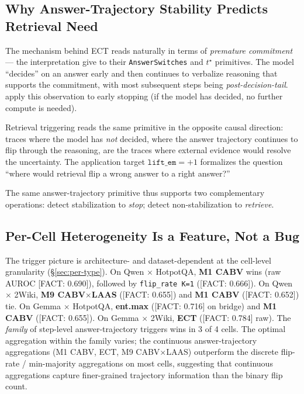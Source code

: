 \documentclass[11pt]{article}
\newcommand{\FACT}[1]{{\color{blue}\textsf{[FACT: #1]}}}
\begin{document}
\subsection{Why Answer-Trajectory Stability Predicts Retrieval Need}
\label{sec:discussion-m8ect}

The mechanism behind ECT reads naturally in terms of
\emph{premature commitment} — the interpretation
\citet{Datta_DecideEarlyExplainLater} give to their
\texttt{AnswerSwitches} and $t^\star$ primitives. The model
``decides'' on an answer early and then continues to verbalize reasoning
that supports the commitment, with most subsequent steps being
\emph{post-decision-tail}. \citeauthor{Datta_DecideEarlyExplainLater}
apply this observation to early stopping (if the model has decided, no
further compute is needed).

Retrieval triggering reads the same primitive in the opposite causal
direction: traces where the model has \emph{not} decided, where the
answer trajectory continues to flip through the reasoning, are the
traces where external evidence would resolve the uncertainty. The
application target $\texttt{lift\_em}=+1$ formalizes the question
``where would retrieval flip a wrong answer to a right answer?''

The same answer-trajectory primitive thus supports two complementary
operations: detect stabilization to \emph{stop}; detect non-stabilization
to \emph{retrieve}.

\subsection{Per-Cell Heterogeneity Is a Feature, Not a Bug}
\label{sec:discussion-types}

The trigger picture is architecture- and dataset-dependent at the cell-level
granularity (\S\ref{sec:per-type}). On Qwen $\times$ HotpotQA,
\textbf{M1 CABV} wins (raw AUROC \FACT{0.690}), followed by
\texttt{flip\_rate K=1} (\FACT{0.666}). On Qwen $\times$ 2Wiki,
\textbf{M9 CABV$\times$LAAS} (\FACT{0.655}) and \textbf{M1 CABV}
(\FACT{0.652}) tie. On Gemma $\times$ HotpotQA, \textbf{ent.max}
(\FACT{0.716} on bridge) and \textbf{M1 CABV} (\FACT{0.655}). On
Gemma $\times$ 2Wiki, \textbf{ECT} (\FACT{0.784} raw). The
\emph{family} of step-level answer-trajectory triggers wins in 3 of 4 cells.
The optimal aggregation within the family varies; the continuous
answer-trajectory aggregations (M1 CABV, ECT, M9 CABV$\times$LAAS) outperform
the discrete flip-rate / min-majority aggregations on most cells, suggesting
that continuous aggregations capture finer-grained trajectory information
than the binary flip count.
\end{document}
